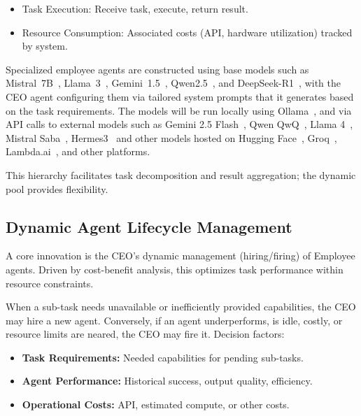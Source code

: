 \documentclass[conference]{IEEEtran}
\begin{document}
\begin{itemize}
\begin{itemize}
            \item Task Execution: Receive task, execute, return result.
            \item Resource Consumption: Associated costs (API, hardware utilization) tracked by system.
        \end{itemize}
        Specialized employee agents are constructed using base models such as Mistral~7B~\cite{jiang2023mistral}, Llama~3~\cite{llama3herd}, Gemini~1.5~\cite{gemini1.5_report}, Qwen2.5~\cite{qwen2.5_report}, and DeepSeek-R1~\cite{deepseekr1_report}, with the CEO agent configuring them via tailored system prompts that it generates based on the task requirements.
        The models will be run locally using Ollama~\cite{ollama}, and via API calls to external models such as Gemini 2.5 Flash~\cite{gemini25flash}, Qwen QwQ~\cite{QwenQwQ32B2025}, Llama 4~\cite{Llama4Herd2025}, Mistral Saba~\cite{MistralSaba2025}, Hermes3~\cite{teknium2024hermes} and other models hosted on Hugging Face~\cite{huggingface2025}, Groq~\cite{groq2025}, Lambda.ai~\cite{lambda2025}, and other platforms.
\end{itemize}
This hierarchy facilitates task decomposition and result aggregation; the dynamic pool provides flexibility.

\subsection{Dynamic Agent Lifecycle Management}
\label{subsec:dynamic_mgmt}
A core innovation is the CEO's dynamic management (hiring/firing) of Employee agents. Driven by cost-benefit analysis, this optimizes task performance within resource constraints.

When a sub-task needs unavailable or inefficiently provided capabilities, the CEO may hire a new agent. Conversely, if an agent underperforms, is idle, costly, or resource limits are neared, the CEO may fire it. Decision factors:
\begin{itemize}
    \item \textbf{Task Requirements:} Needed capabilities for pending sub-tasks.
    \item \textbf{Agent Performance:} Historical success, output quality, efficiency.
    \item \textbf{Operational Costs:} API, estimated compute, or other costs.
\end{itemize}
\end{document}
